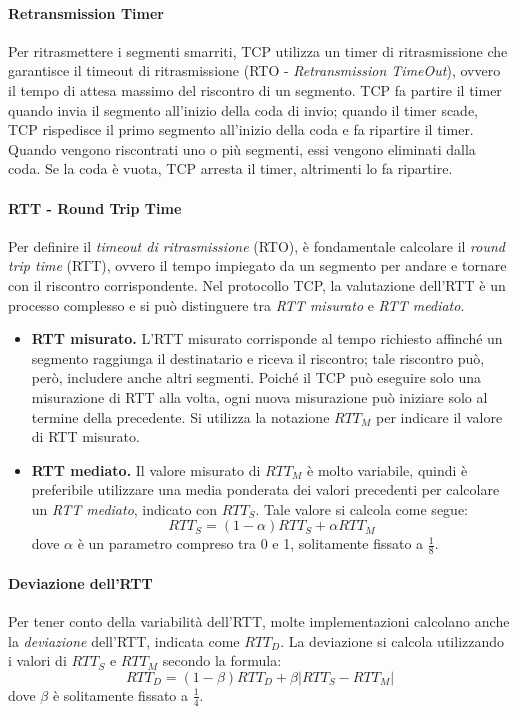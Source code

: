 \documentclass[12pt]{report}
\begin{document}
	\paragraph{Retransmission Timer}
	Per ritrasmettere i segmenti smarriti, TCP utilizza un timer di ritrasmissione che garantisce il timeout di ritrasmissione (RTO - \textit{Retransmission TimeOut}), ovvero il tempo di attesa massimo del riscontro di un segmento. TCP fa partire il timer quando invia il segmento all'inizio della coda di invio; quando il timer scade, TCP rispedisce il primo segmento all'inizio della coda e fa ripartire il timer. Quando vengono riscontrati uno o più segmenti, essi vengono eliminati dalla coda. Se la coda è vuota, TCP arresta il timer, altrimenti lo fa ripartire.

	\paragraph{RTT - Round Trip Time}
	Per definire il \emph{timeout di ritrasmissione} (RTO), è fondamentale calcolare il \emph{round trip time} (RTT), ovvero il tempo impiegato da un segmento per andare e tornare con il riscontro corrispondente. Nel protocollo TCP, la valutazione dell'RTT è un processo complesso e si può distinguere tra \emph{RTT misurato} e \emph{RTT mediato}.

	\begin{itemize}
		\item \textbf{RTT misurato.} L'RTT misurato corrisponde al tempo richiesto affinché un segmento raggiunga il destinatario e riceva il riscontro; tale riscontro può, però, includere anche altri segmenti. Poiché il TCP può eseguire solo una misurazione di RTT alla volta, ogni nuova misurazione può iniziare solo al termine della precedente. Si utilizza la notazione \( RTT_M \) per indicare il valore di RTT misurato.

		\item \textbf{RTT mediato.} Il valore misurato di \( RTT_M \) è molto variabile, quindi è preferibile utilizzare una media ponderata dei valori precedenti per calcolare un \emph{RTT mediato}, indicato con \( RTT_S \). Tale valore si calcola come segue:
		\[
		RTT_S = (1 - \alpha) RTT_S + \alpha RTT_M
		\]
		dove \( \alpha \) è un parametro compreso tra 0 e 1, solitamente fissato a \( \frac{1}{8} \).
	\end{itemize}

	\paragraph{Deviazione dell'RTT}
	Per tener conto della variabilità dell'RTT, molte implementazioni calcolano anche la \emph{deviazione} dell'RTT, indicata come \( RTT_D \). La deviazione si calcola utilizzando i valori di \( RTT_S \) e \( RTT_M \) secondo la formula:
	\[
	RTT_D = (1 - \beta) RTT_D + \beta | RTT_S - RTT_M |
	\]
	dove \( \beta \) è solitamente fissato a \( \frac{1}{4} \).
\end{document}
